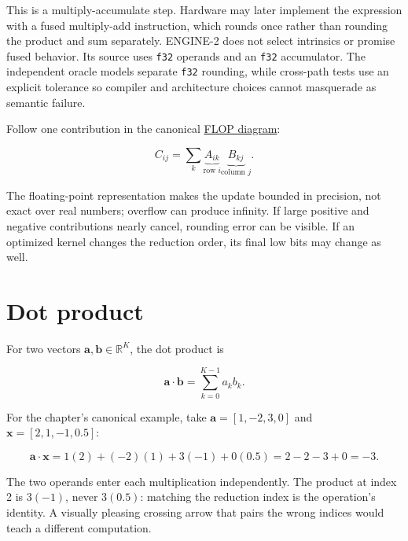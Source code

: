 This is a multiply-accumulate step. Hardware may later implement the
expression with a fused multiply-add instruction, which rounds once
rather than rounding the product and sum separately. ENGINE-2 does not
select intrinsics or promise fused behavior. Its source uses
\texttt{f32} operands and an \texttt{f32} accumulator. The independent
oracle models separate \texttt{f32} rounding, while cross-path tests use
an explicit tolerance so compiler and architecture choices cannot
masquerade as semantic failure.

Follow one contribution in the canonical
\href{https://github.com/hermonai/inside-the-llm-engine/blob/astra-visual-rewrite/diagrams/linear/follow-the-flop.txt}{FLOP
diagram}:

\begin{equation}C_{ij}=\sum_k \underbrace{A_{ik}}_{\text{row }i}\underbrace{B_{kj}}_{\text{column }j}.\end{equation}

The floating-point representation makes the update bounded in precision,
not exact over real numbers; overflow can produce infinity. If large
positive and negative contributions nearly cancel, rounding error can be
visible. If an optimized kernel changes the reduction order, its final
low bits may change as well.

\section{Dot product}\label{dot-product}

For two vectors \(\mathbf{a},\mathbf{b}\in\mathbb{R}^{K}\), the dot
product is

\begin{equation}
\mathbf{a}\cdot\mathbf{b}
=\sum_{k=0}^{K-1}a_kb_k.
\end{equation}

For the chapter's canonical example, take \(\mathbf{a}=[1,-2,3,0]\) and
\(\mathbf{x}=[2,1,-1,0.5]\):

\begin{equation}
\mathbf{a}\cdot\mathbf{x}
=1(2)+(-2)(1)+3(-1)+0(0.5)
=2-2-3+0=-3.
\end{equation}


The two operands enter each multiplication independently. The product at
index 2 is \(3(-1)\), never \(3(0.5)\): matching the reduction index is
the operation's identity. A visually pleasing crossing arrow that pairs
the wrong indices would teach a different computation.

